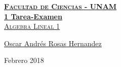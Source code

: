 \documentclass[12pt, fleqn]{article}                             %
\author{Oscar Andrés Rosas}                                     %
\theoremstyle{break}                                            %
\begin{document}
\begin{titlepage}
    
    \pagecolor{TitlePageColor}                                      %
    \color{white}                                                   %

    \vspace                                                         %
    \baselineskip                                                   %

    \makebox[0pt][l]{\rule{1.3\textwidth}{3pt}}                     %
    
    \href{https://compilandoconocimiento.com}                       %
    {\textbf{\textsc{\Huge Facultad de Ciencias - UNAM}}}\\[2.7cm]  %

    \href{\ProjectNameLink/LibroAlgebraLineal}                      %
    {\fontsize{65}{78}\selectfont \textbf{1 Tarea-Examen}\\[0.5cm]  %
    \textcolor{ColorSubtext}{\textsc{\Huge Algebra Lineal 1 }}}     %
    
    \vfill                                                          %
    
    \href{\ProjectAuthorLink}                                       %
    {\LARGE \textsf{Oscar Andrés Rosas Hernandez}}                  %

    \vspace                                                         %
    \baselineskip                                                   %
    
    {\large \textsf{Febrero 2018}}                                  %

\end{titlepage}
\end{document}
